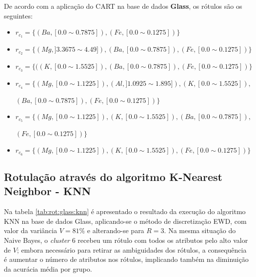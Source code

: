 De acordo com a aplicação do CART na base de dados \textbf{Glass}, os rótulos são os seguintes:
\begin{itemize}[noitemsep]
 \item ${r_{c_1}=\{ (Ba,[ 0.0 \sim 0.7875 ] ),(Fe,[ 0.0 \sim 0.1275 ] ) \} }$  
 \item ${r_{c_2}=\{ (Mg,] 3.3675 \sim  4.49 ] ),(Ba,[ 0.0 \sim 0.7875 ] ),(Fe,[ 0.0 \sim 0.1275 ] ) \} }$
 \item ${r_{c_3}=\{ ((K,[ 0.0 \sim 1.5525 ] ),(Ba,[ 0.0 \sim 0.7875 ] ),(Fe,[ 0.0 \sim 0.1275 ] )  \} }$  
 \item ${r_{c_4}=\{ (Mg,[ 0.0 \sim  1.1225 ] ),(Al,] 1.0925 \sim 1.895 ] ), (K,[ 0.0 \sim 1.5525 ] ),}$

 ${ (Ba,[ 0.0 \sim 0.7875 ] ),(Fe,[ 0.0 \sim 0.1275 ] ) \} }$
 \item ${r_{c_5}=\{ (Mg,[ 0.0 \sim  1.1225 ] ), (K,[ 0.0 \sim 1.5525 ]  ),(Ba,[ 0.0 \sim 0.7875 ] ), }$
 
 ${ (Fe,[ 0.0 \sim 0.1275 ] ) \} }$
 \item ${r_{c_6}=\{ (Mg,[ 0.0 \sim  1.1225  ] ),  (K,[ 0.0 \sim 1.5525] ),(Fe,[ 0.0 \sim 0.1275 ] ) \} }$
\end{itemize}



\subsection{Rotulação através do algoritmo K-Nearest Neighbor - KNN} \label{cap:resultados:ssec:glass:knn}



Na tabela \ref{tab:rot:glass:knn} é apresentado o resultado da execução do algoritmo KNN na base de dados Glass, aplicando-se o método de discretização EWD, com valor da variância ${V=81\%}$ e alterando-se para ${R=3}$. Na mesma situação do Naive Bayes, o \textit{cluster} 6 recebeu um rótulo com todos os atributos pelo alto valor de ${V}$; embora necessário para retirar as ambiguidades dos rótulos, a consequência é aumentar o número de atributos nos rótulos, implicando também na diminuição da acurácia média por grupo. 


